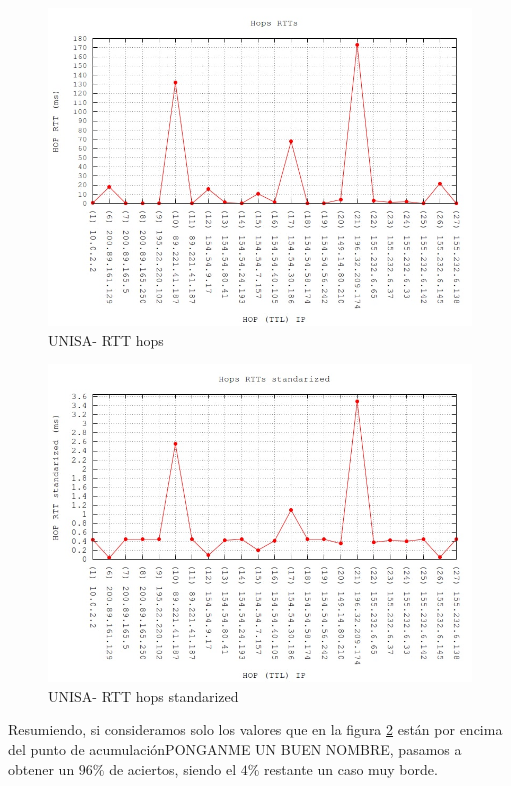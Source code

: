 \begin{figure}[!htbp]
  \centering
    \includegraphics[scale=0.6]{imagenes/unisa-graficos/traceroute-unisa.jpg}
  \caption{UNISA- RTT hops}
  \label{fig:1}
\end{figure}


\begin{figure}[!htbp]
  \centering
    \includegraphics[scale=0.6]{imagenes/unisa-graficos/traceroute-unisa-standarized.jpg}
  \caption{UNISA- RTT hops standarized}
  \label{fig:2}
\end{figure}


Resumiendo, si consideramos solo los valores que en la figura \ref{fig:2} están por encima del punto de acumulaciónPONGANME UN BUEN NOMBRE, pasamos a obtener un $96\%$ de aciertos, siendo el $4\%$ restante un caso muy borde.



